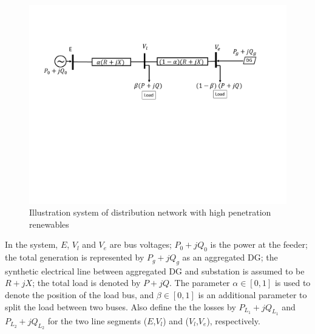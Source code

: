 \documentclass{article}
\begin{document}
\begin{figure}[ht]
    \centering
    \includegraphics[width=\linewidth]{pics/Lcase.pdf}
    \caption{Illustration system of distribution network with high penetration renewables}
    \label{fig:3bussys}
\end{figure}
In the system, $E$, $V_l$ and $V_e$ are bus voltages; $P_0+jQ_0$ is the power at the feeder; the total generation is represented by $P_g+jQ_g$ as an aggregated DG; the synthetic electrical line between aggregated DG and substation is assumed to be $R+jX$; the total load is denoted by $P+jQ$.
The parameter $\alpha\in [0,1]$ is used to denote the position of the load bus, and $\beta\in[0,1]$ is an additional parameter to split the load between two buses. Also define the the losses by $P_{L_1}+jQ_{L_1}$ and $P_{L_2}+jQ_{L_2}$ for the two line segments ($E$,$V_l$) and ($V_l$,$V_e$), respectively.
    
\end{document}
